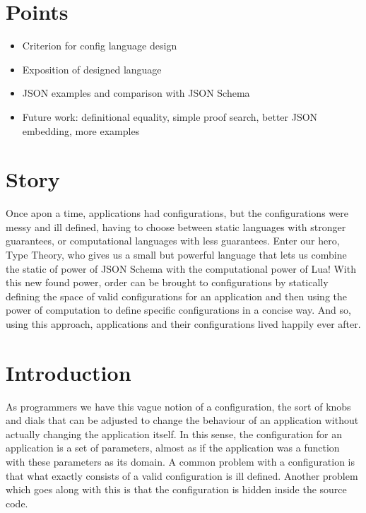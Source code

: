 \documentclass{article}
\begin{document}
\section{Points}

\begin{itemize}

\item Criterion for config language design
\item Exposition of designed language
\item JSON examples and comparison with JSON Schema
\item Future work: definitional equality, simple proof search, better JSON embedding, more examples

\end{itemize}

\section{Story}

Once apon a time, applications had configurations, but the configurations were messy and ill defined, having to choose between static languages with stronger guarantees, or computational languages with less guarantees.
Enter our hero, Type Theory, who gives us a small but powerful language that lets us combine the static of power of JSON Schema with the computational power of Lua!
With this new found power, order can be brought to configurations by statically defining the space of valid configurations for an application and then using the power of computation to define specific configurations in a concise way.
And so, using this approach, applications and their configurations lived happily ever after.

\section{Introduction}

As programmers we have this vague notion of a configuration, the sort of knobs and dials that can be adjusted to change the behaviour of an application without actually changing the application itself.
In this sense, the configuration for an application is a set of parameters, almost as if the application was a function with these parameters as its domain.
A common problem with a configuration is that what exactly consists of a valid configuration is ill defined.
Another problem which goes along with this is that the configuration is hidden inside the source code.
\end{document}
